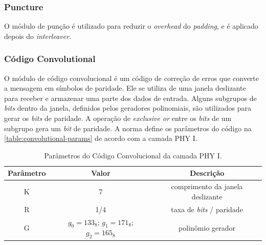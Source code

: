 	\subsubsection{Puncture}
	
	O módulo de punção é utilizado para reduzir o \textit{overhead} do \textit{padding}, e é aplicado depois do \textit{interleaver}.
	
	\subsubsection{Código Convolutional}
	
	O módulo de código convolucional é um código de correção de erros que converte a mensagem em símbolos de paridade. Ele se utiliza de uma janela deslizante para receber e armazenar uma parte dos dados de entrada. Alguns subgrupos de \textit{bits} dentro da janela, definidos pelos geradores polinomiais, são utilizados para gerar os \textit{bits} de paridade. A operação de \textit{exclusive or} entre os \textit{bits} de um subgrupo gera um \textit{bit} de paridade. A norma define os parâmetros do código na \autoref{table:convolutional-params} de acordo com a camada PHY I. 
	
	\begin{table}[ht]
		\caption{Parâmetros do Código Convolucional da camada PHY I.}
		\centering
		\begin{tabular}{c c c}
			\hline
			Parâmetro & Valor & Descrição \\ \hline
			K & 7 & comprimento da janela deslizante \\
			R & 1/4 & taxa de \textit{bits} / paridade \\ 
			G & $g_{0} = 133_{8}$; $g_{1} = 171_{8}$; $g_{2} = 165_{8}$ & polinômio gerador \\ \hline
		\end{tabular}
		\label{table:convolutional-params}
	\end{table}

